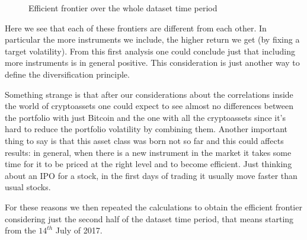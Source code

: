 \begin{figure}[H]
    \centering
    \caption{Efficient frontier over the whole dataset time period}
    \label{front1}
\end{figure}
\bigskip

Here we see that each of these frontiers are different from each other. In particular the more instruments we include, the higher return we get (by fixing a target volatility). From this first analysis one could conclude just that including more instruments is in general positive. This consideration is just another way to define the diversification principle.

Something strange is that after our considerations about the correlations inside the world of cryptoassets one could expect to see almost no differences between the portfolio with just Bitcoin and the one with all the cryptoassets since it's hard to reduce the portfolio volatility by combining them.
Another important thing to say is that this asset class was born not so far and this could affects results: in general, when there is a new instrument in the market it takes some time for it to be priced at the right level and to become efficient. Just thinking about an IPO for a stock, in the first days of trading it usually move  faster than usual stocks.

For these reasons we then repeated the calculations to obtain the efficient frontier considering just the second half of the dataset time period, that means starting from the $14^{th}$ July of 2017. 

